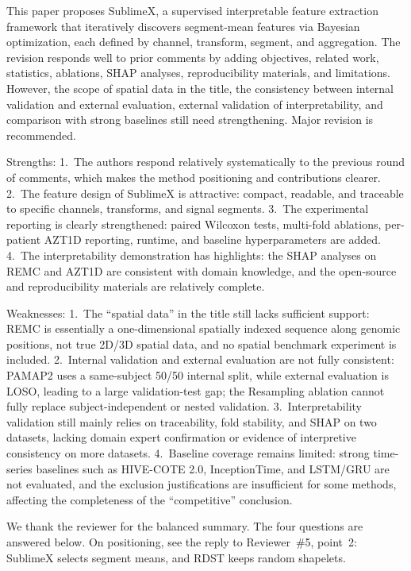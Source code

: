 \documentclass[11pt]{article}
\makeatletter
\newcommand{\rsp}{\par\vspace{0.9em}}
\newcommand{\rc}[1]{\begin{reviewerbox}#1\end{reviewerbox}}
\newcommand{\response}[2]{%
  \begin{responsebox}#1%
  \def\@responseitems{#2}%
  \ifx\@responseitems\empty\else\begin{itemize}[nosep,leftmargin=1.2em]#2\end{itemize}\fi
  \end{responsebox}\rsp}
\makeatother
\begin{document}
\rc{This paper proposes SublimeX, a supervised interpretable feature extraction framework that
iteratively discovers segment-mean features via Bayesian optimization, each defined by channel,
transform, segment, and aggregation. The revision responds well to prior comments by adding
objectives, related work, statistics, ablations, SHAP analyses, reproducibility materials, and
limitations. However, the scope of spatial data in the title, the consistency between internal
validation and external evaluation, external validation of interpretability, and comparison with
strong baselines still need strengthening. Major revision is recommended.

Strengths: 1.~The authors respond relatively systematically to the previous round of comments, which
makes the method positioning and contributions clearer. 2.~The feature design of SublimeX is
attractive: compact, readable, and traceable to specific channels, transforms, and signal segments.
3.~The experimental reporting is clearly strengthened: paired Wilcoxon tests, multi-fold ablations,
per-patient AZT1D reporting, runtime, and baseline hyperparameters are added. 4.~The interpretability
demonstration has highlights: the SHAP analyses on REMC and AZT1D are consistent with domain
knowledge, and the open-source and reproducibility materials are relatively complete.

Weaknesses: 1.~The ``spatial data'' in the title still lacks sufficient support: REMC is essentially a
one-dimensional spatially indexed sequence along genomic positions, not true 2D/3D spatial data, and
no spatial benchmark experiment is included. 2.~Internal validation and external evaluation are not
fully consistent: PAMAP2 uses a same-subject 50/50 internal split, while external evaluation is LOSO,
leading to a large validation-test gap; the Resampling ablation cannot fully replace
subject-independent or nested validation. 3.~Interpretability validation still mainly relies on
traceability, fold stability, and SHAP on two datasets, lacking domain expert confirmation or evidence
of interpretive consistency on more datasets. 4.~Baseline coverage remains limited: strong time-series
baselines such as HIVE-COTE 2.0, InceptionTime, and LSTM/GRU are not evaluated, and the exclusion
justifications are insufficient for some methods, affecting the completeness of the ``competitive''
conclusion.}

\response{We thank the reviewer for the balanced summary. The four questions are answered below.
On positioning, see the reply to Reviewer~\#5, point~2: SublimeX selects segment means, and RDST
keeps random shapelets.}{}
\end{document}
